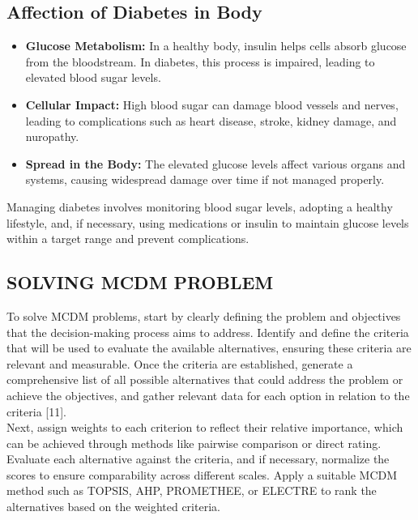 \documentclass[12pt,a4paper]{article}
\begin{document}
\subsection*{Affection of Diabetes in Body}
\begin{itemize}
     \item \textbf{Glucose Metabolism: }In a healthy body, insulin helps cells absorb glucose from the bloodstream. In diabetes, this process is impaired, leading to elevated blood sugar levels.
      \item \textbf{Cellular Impact: }High blood sugar can damage blood vessels and nerves, leading to complications such as heart disease, stroke, kidney damage, and nuropathy.
       \item \textbf{Spread in the Body: }The elevated glucose levels affect various organs and systems, causing widespread damage over time if not managed properly.
\end{itemize}

Managing diabetes involves monitoring blood sugar levels, adopting a healthy lifestyle, and, if necessary, using medications or insulin to maintain glucose levels within a target range and prevent complications.

\subsection{SOLVING MCDM PROBLEM }

\hspace{1em}To solve MCDM problems, start by clearly defining the problem and objectives that the decision-making process aims to address. Identify and define the criteria that will be used to evaluate the available alternatives, ensuring these criteria are relevant and measurable. Once the criteria are established, generate a comprehensive list of all possible alternatives that could address the problem or achieve the objectives, and gather relevant data for each option in relation to the criteria [11].\\

Next, assign weights to each criterion to reflect their relative importance, which can be achieved through methods like pairwise comparison or direct rating. Evaluate each alternative against the criteria, and if necessary, normalize the scores to ensure comparability across different scales. Apply a suitable MCDM method such as TOPSIS, AHP, PROMETHEE, or ELECTRE to rank the alternatives based on the weighted criteria.\\
\end{document}
